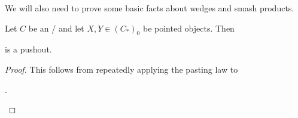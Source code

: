 We will also need to prove some basic facts about wedges and smash products.
\begin{lemma}\label{lem:poOfCollapseMapsIsTrivial}
    Let $C$ be an \inftytop/ and let $X,Y\in \left(C_*\right)_0$ be pointed objects. 
    Then 
    \begin{center}
    \end{center}
    is a pushout.
    \begin{proof}
        This follows from repeatedly applying the pasting law to 
        \begin{center}
            \;.
        \end{center}
    \end{proof}
\end{lemma}
